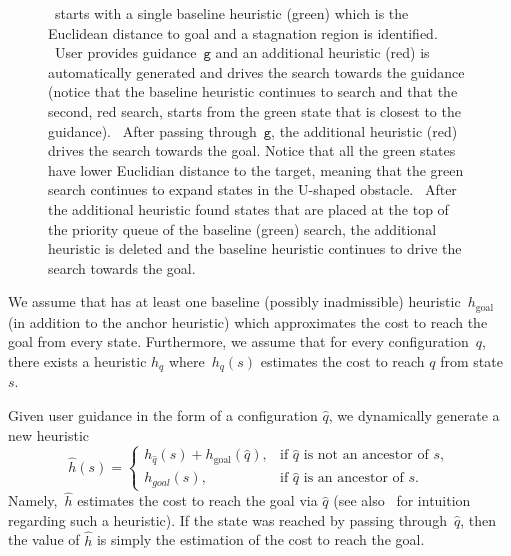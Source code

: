 \documentclass{article}
\begin{document}
\begin{figure}[t]
{    %
	~\mhastar starts with a single baseline heuristic (green) which is the Euclidean distance to goal and a stagnation region is identified.
	~User provides guidance~$\texttt{g}$ and an additional heuristic (red) is automatically generated and drives the search towards the guidance (notice that the baseline heuristic continues to search and that the second, red search, starts from the green state that is closest to the guidance).
	~After passing through~$\texttt{g}$, the additional heuristic (red) drives the search towards the goal.
	Notice that all the green states have lower Euclidian distance to  the target, meaning that the green search continues to expand states in the U-shaped obstacle.
	~After the additional heuristic found states that are placed at the top of the priority queue of the baseline (green) search, the additional heuristic is deleted and the baseline heuristic continues to drive the search towards the goal.
  }%
  \label{fig:filmstrip-dynamic_heuristic}%
\end{figure}



We assume that \mhastar has at least one baseline (possibly inadmissible) heuristic~$h_{\text{goal}}$ (in addition to the anchor heuristic) which approximates the cost to reach the goal from every state.
Furthermore, we assume that for every configuration~$q$, there exists a heuristic $h_q$ where~$h_q(s)$ estimates the cost to reach $q$ from state $s$.
%

Given user guidance in the form of a configuration $\hat{q}$, we dynamically generate a new heuristic $$
    \hat{h}(s)= 
\begin{cases}
    h_{\hat{q}}(s) + h_{\text{goal}}(\hat{q}),	& 
    		\text{if } \hat{q} \text{ is not an ancestor of } s,\\
    h_{{goal}}(s),            		& 
    		\text{if } \hat{q} \text{ is an ancestor of } s.
\end{cases}
$$
Namely,~$\hat{h}$ estimates the 
cost to reach the goal via $\hat{q}$ (see also~\cite{CGD86} for intuition regarding such a heuristic). 
If the state was reached by passing through~$\hat{q}$, then the value of $\hat{h}$ is simply the estimation of the cost to reach the goal.
\end{document}
